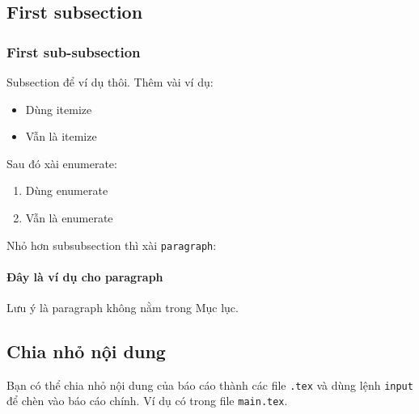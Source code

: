 \subsection{First subsection}
\subsubsection{First sub-subsection}
Subsection để ví dụ thôi. Thêm vài ví dụ:
\begin{itemize}
    \item Dùng itemize
    \item Vẫn là itemize
\end{itemize}
Sau đó xài enumerate:
\begin{enumerate}
    \item Dùng enumerate
    \item Vẫn là enumerate
\end{enumerate}
Nhỏ hơn subsubsection thì xài \texttt{paragraph}:

\paragraph{Đây là ví dụ cho paragraph}
Lưu ý là paragraph không nằm trong Mục lục.

\subsection{Chia nhỏ nội dung}
Bạn có thể chia nhỏ nội dung của báo cáo thành các file \texttt{.tex} và dùng lệnh \texttt{input} để chèn vào báo cáo chính. Ví dụ có trong file \texttt{main.tex}.